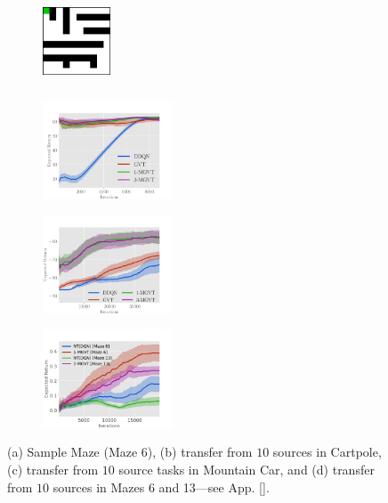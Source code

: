 \documentclass{article}
\begin{document}
\begin{figure}[t]
  \begin{subfigure}[b]{0.15\textwidth}
    \includegraphics[trim=0.0cm 0.0cm 0.0cm 0.0cm,clip=true,height=2.6cm, width=2.0cm]{images/maze/maze6.png}
    \caption{}
  \end{subfigure}
  \begin{subfigure}[b]{0.27\textwidth}
    \includegraphics[trim=0.5cm 0cm 1.8cm 1.3cm,clip=true,height=2.9cm]{images/cartpole/lrev.pdf}
    \caption{}
  \end{subfigure}
    \begin{subfigure}[b]{0.27\textwidth}
    \includegraphics[trim=0.5cm 0cm 1.6cm 1.3cm,clip=true,height=2.9cm]{images/mountaincar/lrev.pdf}
    \caption{}
  \end{subfigure}
    \begin{subfigure}[b]{0.27\textwidth}
    \includegraphics[trim=0.5cm 0cm 1.6cm 1.3cm,clip=true,height=2.9cm]{images/maze/lrev.pdf}
    \caption{}
  \end{subfigure}
  \caption{(a) Sample Maze (Maze 6), (b) transfer from $10$ sources in Cartpole, (c) transfer from $10$ source tasks in Mountain Car, and (d) transfer from $10$ sources in Mazes 6 and 13---see App. \ref{}.}
  \label{fig:ccmazeplots}
\end{figure}
\end{document}
